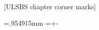 %
%

[ULSBS chapter corner marks]

%
\newdimen\ulChapterCornerMarkOffset\ulChapterCornerMarkOffset=2.5mm%
\newdimen\ulChapterCornerMarkWidth\ulChapterCornerMarkWidth=.954915mm%
\newdimen\ulChapterCornerMarkLength\ulChapterCornerMarkLength=\dimexpr\ulTopMargin+\ulHeadHeight-\ulChapterCornerMarkOffset\relax%
\newcount\ulChapterCornerMarkDashCount{}%

\ulsbs@newbool\ifulChapterCornerMarkDashed\ulsbs@chapcornermarkdashedtrue\ulsbs@chapcornermarkdashedfalse\ulChapterCornerMarkDashed\ulsbs@chapcornermarkdashedfalse

\newdimen\ulsbs@ccm@halfw
\newdimen\ulsbs@ccm@arm
\newdimen\ulsbs@ccm@reach
\newdimen\ulsbs@ccm@start
\newdimen\ulsbs@ccm@end
\newcount\ulsbs@ccm@segments
\newcount\ulsbs@ccm@segment

\newcommand*\ulsbs@ccm@boundary[1]{\dimexpr\ulsbs@ccm@halfw
  +\ulsbs@ccm@arm*\numexpr#1\relax/\ulsbs@ccm@segments\relax}

